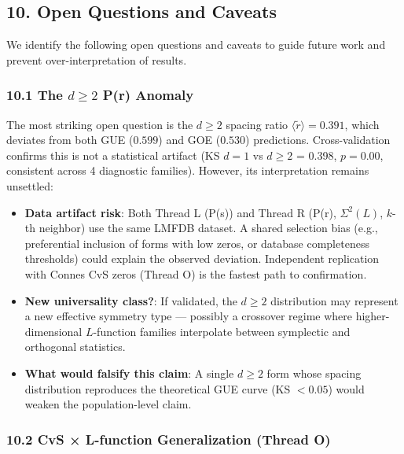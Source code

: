 \documentclass[
]{article}
\providecommand{\tightlist}{%
  \setlength{\itemsep}{0pt}\setlength{\parskip}{0pt}}
\begin{document}
\hypertarget{open-questions-and-caveats}{%
\subsection{10. Open Questions and
Caveats}\label{open-questions-and-caveats}}

We identify the following open questions and caveats to guide future
work and prevent over-interpretation of results.

\hypertarget{the-dge-2-pr-anomaly}{%
\subsubsection{\texorpdfstring{10.1 The \(d\ge 2\) P(r)
Anomaly}{10.1 The d\textbackslash ge 2 P(r) Anomaly}}\label{the-dge-2-pr-anomaly}}

The most striking open question is the \(d\ge 2\) spacing ratio
\(\langle\tilde{r}\rangle = 0.391\), which deviates from both GUE
(\(0.599\)) and GOE (\(0.530\)) predictions. Cross-validation confirms
this is not a statistical artifact (KS \(d=1\) vs \(d\ge 2\) = 0.398,
\(p = 0.00\), consistent across 4 diagnostic families). However, its
interpretation remains unsettled:

\begin{itemize}
\tightlist
\item
  \textbf{Data artifact risk}: Both Thread L (P(s)) and Thread R (P(r),
  \(\Sigma^2(L)\), \(k\)-th neighbor) use the same LMFDB dataset. A
  shared selection bias (e.g., preferential inclusion of forms with low
  zeros, or database completeness thresholds) could explain the observed
  deviation. Independent replication with Connes CvS zeros (Thread O) is
  the fastest path to confirmation.
\item
  \textbf{New universality class?}: If validated, the \(d\ge 2\)
  distribution may represent a new effective symmetry type --- possibly
  a crossover regime where higher-dimensional \(L\)-function families
  interpolate between symplectic and orthogonal statistics.
\item
  \textbf{What would falsify this claim}: A single \(d\ge 2\) form whose
  spacing distribution reproduces the theoretical GUE curve (KS
  \(< 0.05\)) would weaken the population-level claim.
\end{itemize}

\hypertarget{cvs-l-function-generalization-thread-o}{%
\subsubsection{10.2 CvS × L-function Generalization (Thread
O)}\label{cvs-l-function-generalization-thread-o}}
\end{document}
